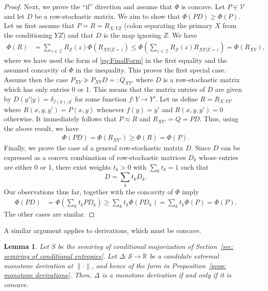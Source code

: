\documentclass[aps,pra,11pt,onecolumn,nofootinbib,tightenlines]{revtex4-2}
\newtheorem{lemma}[theorem]{Lemma}
\theoremstyle{definition}
\newcommand{\mc}[1]{\mathcal{#1}}
\begin{document}
\begin{proof}
Next, we prove the “if” direction and assume that $\Phi$ is concave. Let $P \in \mathcal{V}$ and let $D$ be a row-stochastic matrix. We aim to show that $\Phi(PD) \geq \Phi(P)$. Let us first assume that $P=R=R_{X:YZ}$ (colon separating the primary $X$ from the conditioning $YZ$) and that $D$ is the map ignoring $Z$. %
We have
\begin{align}
\Phi(R)&=\sum_{z\in\mc Z}R_Z(z)\Phi(R_{XY|Z=z})\leq\Phi\left(\sum_{z\in\mc Z}R_Z(z)R_{XY|Z=z}\right)=\Phi(R_{XY}),
\end{align}
where we have used the form of \eqref{eq:FinalForm} in the first equality and the assumed concavity of $\Phi$ in the inequality. This proves the first special case. Assume then the case $P_{XY}\succeq P_{XY}D=:Q_{XY'}$ where $D$ is a row-stochastic matrix which has only entries 0 or 1. This means that the matrix entries of $D$ are given by $D(y'|y)=\delta_{f(y),y'}$ for some function $f:Y\to Y'$. Let us define $R=R_{X:YY'}$ where $R(x,y,y')=P(x,y)$ whenever $f(y)=y'$ and $R(x,y,y')=0$ otherwise. It immediately follows that $P\approx R$ and $R_{XY'}=Q=PD$. Thus, using the above result, we have
\begin{align}
\Phi(PD)=\Phi(R_{XY'})\geq\Phi(R)=\Phi(P).
\end{align}
Finally, we prove the case of a general row-stochastic matrix $D$. Since $D$ can be expressed as a convex combination of row-stochastic matrices $D_k$ whose entries are either 0 or 1, there exist weights $t_k > 0$ with $\sum_k t_k = 1$
such that
\begin{equation}
    D = \sum_k t_k D_k.
\end{equation}
Our observations thus far, together with the concavity of $\Phi$ imply
\begin{align}\label{eq:apuconv}
\Phi(PD)&=\Phi\left(\sum_k t_kPD_k\right)\geq\sum_k t_k\Phi(PD_k)=\sum_k t_k\Phi(P)=\Phi(P).
\end{align}
The other cases are similar.
\end{proof}

A similar argument applies to derivations, which must be concave.

\begin{lemma}
\label{lem: conv derivations}
Let $S$ be the semiring of conditional majorization of Section~\ref{sec: semiring of conditional entropies}. Let $\Delta: \mathcal{S} \to \mathbb{R}$ be a candidate extremal monotone derivation at $\|\cdot\|$, and hence of the form in Proposition~\ref{prop: monotone derivations}.
Then, $\Delta$ is a monotone derivation if and only if it is concave.
\end{lemma}
\end{document}
